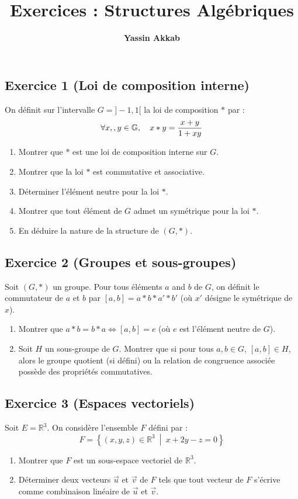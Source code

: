 \documentclass{article}
\title{\textbf{Exercices : Structures Algébriques}}
\author{\textbf{Yassin Akkab}}
\begin{document}
	
	\maketitle
	
	\subsection*{Exercice 1 (Loi de composition interne)}
	On définit sur l'intervalle $G = ]-1, 1[$ la loi de composition $*$ par :
	\[ \qcq{x}[, y]{G}, \quad x * y = \frac{x + y}{1 + xy} \]
	\begin{enumerate}
		\item Montrer que $*$ est une loi de composition interne sur $G$.
		\item Montrer que la loi $*$ est commutative et associative.
		\item Déterminer l'élément neutre pour la loi $*$.
		\item Montrer que tout élément de $G$ admet un symétrique pour la loi $*$.
		\item En déduire la nature de la structure de $(G, *)$.
	\end{enumerate}
	
	\subsection*{Exercice 2 (Groupes et sous-groupes)}
	Soit $(G, *)$ un groupe. Pour tous éléments $a$ and $b$ de $G$, on définit le commutateur de $a$ et $b$ par $[a, b] = a * b * a' * b'$ (où $x'$ désigne le symétrique de $x$).
	\begin{enumerate}
		\item Montrer que $a * b = b * a \iff [a, b] = e$ (où $e$ est l'élément neutre de $G$).
		\item Soit $H$ un sous-groupe de $G$. Montrer que si pour tous $a, b \in G$, $[a, b] \in H$, alors le groupe quotient (si défini) ou la relation de congruence associée possède des propriétés commutatives.
	\end{enumerate}
	
	\subsection*{Exercice 3 (Espaces vectoriels)}
	Soit $E = \mathbb{R}^3$. On considère l'ensemble $F$ défini par :
	\[ F = \left\{ (x, y, z) \in \mathbb{R}^3 \ \middle| \ x + 2y - z = 0 \right\} \]
	\begin{enumerate}
		\item Montrer que $F$ est un sous-espace vectoriel de $\mathbb{R}^3$.
		\item Déterminer deux vecteurs $\vec{u}$ et $\vec{v}$ de $F$ tels que tout vecteur de $F$ s'écrive comme combinaison linéaire de $\vec{u}$ et $\vec{v}$.
	\end{enumerate}
	
\end{document}
